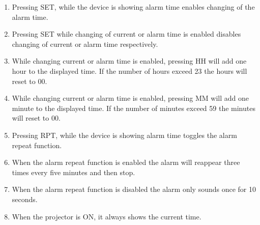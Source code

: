 \documentclass[Main_Assignment2]{subfiles}
\begin{document}
\begin{enumerate}[RE\arabic*:]
	\item
	Pressing SET, while the device is showing alarm time enables changing of the alarm time.

	\item
	Pressing SET while changing of current or alarm time is enabled disables changing of current or alarm time respectively.

	\item
	While changing current or alarm time is enabled, pressing HH will add one hour to the displayed time. If the number of hours exceed 23 the hours will reset to 00.

	\item
	While changing current or alarm time is enabled, pressing MM will add one minute to the displayed time. If the number of minutes exceed 59 the minutes will reset to 00.

	\item 
	Pressing RPT, while the device is showing alarm time toggles the alarm repeat function.

	\item
	When the alarm repeat function is enabled the alarm will reappear three times every five minutes and then stop.

	\item
	When the alarm repeat function is disabled the alarm only sounds once for 10 seconds.

	\item
	When the projector is ON, it always shows the current time.

\end{enumerate}
\end{document}
